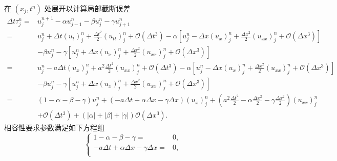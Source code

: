 \begin{solution*}
    在 $(x_j,t^n)$ 处展开以计算局部截断误差
    \begin{align*}
        \Delta t \tau_j^n ={} & u_j^{n+1} - \alpha u_{j-1}^n - \beta u_j^n - \gamma u_{j+1}^n                                \\
        ={}                   & u_j^n + \Delta t (u_t)_j^n + \frac{\Delta t^2}2 (u_{tt})_j^n + \mathcal{O}(\Delta t^3)
        - \alpha \left[
            u_j^n - \Delta x (u_x)_j^n + \frac{\Delta x^2}2 (u_{xx})_j^n + \mathcal{O}(\Delta x^3)
        \right]                                                                                                              \\
                              & - \beta u_j^n
        - \gamma \left[
            u_j^n + \Delta x (u_x)_j^n + \frac{\Delta x^2}2 (u_{xx})_j^n + \mathcal{O}(\Delta x^3)
        \right]                                                                                                              \\
        ={}                   & u_j^n - a \Delta t (u_x)_j^n + a^2 \frac{\Delta t^2}2 (u_{xx})_j^n + \mathcal{O}(\Delta t^3)
        - \alpha \left[
            u_j^n - \Delta x (u_x)_j^n + \frac{\Delta x^2}2 (u_{xx})_j^n + \mathcal{O}(\Delta x^3)
        \right]                                                                                                              \\
                              & - \beta u_j^n
        - \gamma \left[
            u_j^n + \Delta x (u_x)_j^n + \frac{\Delta x^2}2 (u_{xx})_j^n + \mathcal{O}(\Delta x^3)
        \right]                                                                                                              \\
        ={}                   & (1-\alpha - \beta - \gamma) u_j^n +
        (- a \Delta t + \alpha \Delta x - \gamma \Delta x) (u_x)_j^n
        + \left(a^2 \frac{\Delta t^2}2 - \alpha \frac{\Delta x^2}2 - \gamma \frac{\Delta x^2}2\right) (u_{xx})_j^n           \\
                              & + \mathcal{O}(\Delta t^3) + (|\alpha| + |\beta| + |\gamma|) \mathcal{O}(\Delta x^3).
    \end{align*}
    相容性要求参数满足如下方程组
    \[
        \left\{
        \begin{aligned}
            1-\alpha - \beta - \gamma ={}                                                      & 0, \\
            - a \Delta t + \alpha \Delta x - \gamma \Delta x ={}                               & 0, \\

\end{aligned}\]
\end{solution*}

